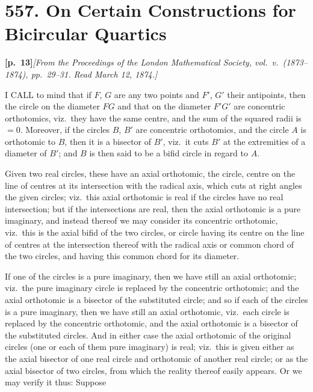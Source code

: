 \documentclass[11pt,a4paper]{article}
\begin{document}
\section*{\textbf{557.} On Certain Constructions for Bicircular Quartics}

\noindent\textbf{[p.~13]}\quad\textit{[From the Proceedings of the London Mathematical Society, vol.~v.\ (1873--1874), pp.~29--31. Read March 12, 1874.]}

\bigskip

I CALL to mind that if $F$, $G$ are any two points and $F'$, $G'$ their antipoints, then the circle on the diameter $FG$ and that on the diameter $F'G'$ are concentric orthotomics, viz.\ they have the same centre, and the sum of the squared radii is $= 0$. Moreover, if the circles $B$, $B'$ are concentric orthotomics, and the circle $A$ is orthotomic to $B$, then it is a bisector of $B'$, viz.\ it cuts $B'$ at the extremities of a diameter of $B'$; and $B$ is then said to be a bifid circle in regard to $A$.

\medskip

Given two real circles, these have an axial orthotomic, the circle, centre on the line of centres at its intersection with the radical axis, which cuts at right angles the given circles; viz.\ this axial orthotomic is real if the circles have no real intersection; but if the intersections are real, then the axial orthotomic is a pure imaginary, and instead thereof we may consider its concentric orthotomic, viz.\ this is the axial bifid of the two circles, or circle having its centre on the line of centres at the intersection thereof with the radical axis or common chord of the two circles, and having this common chord for its diameter.

\medskip

If one of the circles is a pure imaginary, then we have still an axial orthotomic; viz.\ the pure imaginary circle is replaced by the concentric orthotomic; and the axial orthotomic is a bisector of the substituted circle; and so if each of the circles is a pure imaginary, then we have still an axial orthotomic, viz.\ each circle is replaced by the concentric orthotomic, and the axial orthotomic is a bisector of the substituted circles. And in either case the axial orthotomic of the original circles (one or each of them pure imaginary) is real; viz.\ this is given either as the axial bisector of one real circle and orthotomic of another real circle; or as the axial bisector of two circles, from which the reality thereof easily appears. Or we may verify it thus: Suppose
\end{document}
